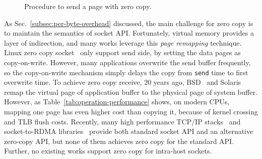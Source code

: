 \begin{figure}[t]
	\centering
	\hspace{0.02\textwidth}
	\vspace{-10pt}
	\caption{Procedure to send a page with zero copy.}
\end{figure}


As Sec.~\ref{subsec:per-byte-overhead} discussed, the main challenge for zero copy is to maintain the semantics of socket API.
Fortunately, virtual memory provides a layer of indirection, and many works leverage this \emph{page remapping} technique.
Linux zero copy socket~\cite{linux-zero-copy} only support send side, by setting the data pages as copy-on-write.
However, many applications overwrite the send buffer frequently, so the copy-on-write mechanism simply delays the copy from \texttt{send} time to first overwrite time. 
To achieve zero copy receive, 20 years ago, BSD~\cite{thadani1995efficient} and Solaris~\cite{chu1996zero} remap the virtual page of application buffer to the physical page of system buffer. However, as Table~\ref{tab:operation-performance} shows, on modern CPUs, mapping one page has even higher cost than copying it, because of kernel crossing and TLB flush costs.
Recently, many high performance TCP/IP stacks~\cite{han2012megapipe,yasukata2016stackmap} and socket-to-RDMA libraries~\cite{rsockets,socketsdirect} provide both standard socket API and an alternative zero-copy API, but none of them achieves zero copy for the standard API.
Further, no existing works support zero copy for intra-host sockets.


